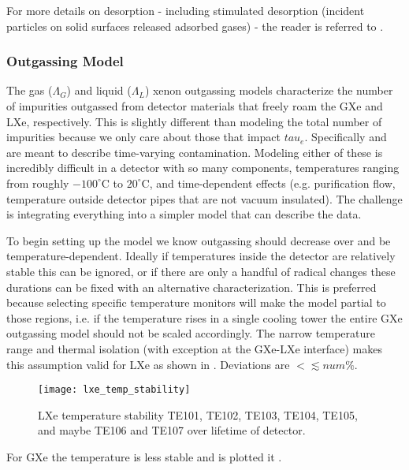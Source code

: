 For more details on desorption - including stimulated desorption (incident particles on solid surfaces released adsorbed gases) - the
reader is referred to .



\subsubsection{Outgassing Model}
\label{subsubsec:electron_lifetime_model_outgassing_model}
The gas ($\Lambda_G$) and liquid ($\Lambda_L$) xenon outgassing models characterize the number of impurities outgassed from detector
materials that freely roam
the GXe and LXe, respectively.  This is slightly different than modeling the total number of impurities because we only care about those
that impact $tau_e$.  Specifically \outg and \outl are meant to describe time-varying contamination.  Modeling either of these is
incredibly difficult in a detector with so
many components, temperatures ranging from roughly $-100^{\circ} \mathrm{C}$ to $20^{\circ} \mathrm{C}$, and time-dependent effects (e.g.
purification flow, temperature outside detector pipes that are not vacuum insulated).  The challenge is integrating everything into
a simpler model that can describe the data.

To begin setting up the model we know outgassing should decrease over and be temperature-dependent.  Ideally if temperatures inside the
detector are relatively stable this can be ignored, or if there are only a handful of radical changes these durations can be fixed with an
alternative characterization.  This is preferred because selecting specific temperature monitors will make the model
partial to those regions, i.e. if the temperature rises in a single cooling tower the entire GXe outgassing model should not be scaled
accordingly.  The narrow temperature range and thermal isolation (with exception at the GXe-LXe interface) makes this assumption valid for
LXe as shown in .  Deviations are $< \lesssim num\%$.

\begin{figure}
\centering
\texttt{[image: lxe\_temp\_stability]}
\caption{LXe temperature stability TE101, TE102, TE103, TE104, TE105, and maybe TE106 and TE107 over lifetime of detector.}
\label{fig:electron_lifetime_model_outgassing_lxe_temp}
\end{figure}

For GXe the temperature is less stable and is plotted it .

